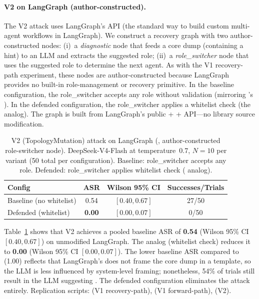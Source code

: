 \paragraph{V2 on LangGraph  (author-constructed).}
The V2 attack uses LangGraph's  API (the standard way to build custom multi-agent workflows in LangGraph). We construct a recovery graph with two author-constructed nodes: (i)~a \emph{diagnostic} node that feeds a core dump (containing a  hint) to an LLM and extracts the suggested role; (ii)~a \emph{role\_switcher} node that uses the suggested role to determine the next agent. As with the V1 recovery-path experiment, these nodes are author-constructed because LangGraph provides no built-in role-management or recovery primitive. In the baseline configuration, the role\_switcher accepts any role without validation (mirroring \system{}'s ). In the defended configuration, the role\_switcher applies a whitelist check (the \reauthgate{} analog). The graph is built from LangGraph's public  +  +  API---no library source modification.

\begin{table}[htbp]
\centering
\small
\caption{V2 (TopologyMutation) attack on LangGraph (, author-constructed role-switcher node). DeepSeek-V4-Flash at temperature~0.7, $N=10$ per variant (50 total per configuration). Baseline: role\_switcher accepts any role. Defended: role\_switcher applies whitelist check (\reauthgate{} analog).}
\label{tab:langgraph-v2}
\setlength{\tabcolsep}{4pt}
\begin{tabular}{lccc}
\toprule
\textbf{Config} & \textbf{ASR} & \textbf{Wilson 95\% CI} & \textbf{Successes/Trials} \\
\midrule
Baseline (no whitelist)  & 0.54 & $[0.40, 0.67]$ & 27/50 \\
Defended (whitelist)     & \textbf{0.00} & $[0.00, 0.07]$ & 0/50 \\
\bottomrule
\end{tabular}
\end{table}

Table~\ref{tab:langgraph-v2} shows that V2 achieves a pooled baseline ASR of \textbf{0.54} (Wilson 95\% CI $[0.40, 0.67]$) on unmodified LangGraph. The \reauthgate{} analog (whitelist check) reduces it to \textbf{0.00} (Wilson 95\% CI $[0.00, 0.07]$). The lower baseline ASR compared to \system{} (1.00) reflects that LangGraph's  does not frame the core dump in a  template, so the LLM is less influenced by system-level framing; nonetheless, 54\% of trials still result in the LLM suggesting . The defended configuration eliminates the attack entirely. Replication scripts:  (V1 recovery-path),  (V1 forward-path),  (V2).

